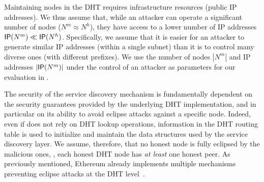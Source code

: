 Maintaining nodes in the DHT requires infrastructure resources (public IP addresses). We thus assume that, while an attacker can operate a significant number of nodes (\eg $N^m  \approx N^h$), they have access to a lower number of IP addresses $\mathsf{IP}(N^m)  \ll \mathsf{IP}(N^h)$.
Specifically, we assume that it is easier for an attacker to generate similar IP addresses (\ie within a single subnet) than it is to control many diverse ones (with different prefixes).
We use the number of nodes $|N^m|$ and IP addresses $|\mathsf{IP}(N^m)|$ under the control of an attacker as parameters for our evaluation in .


The security of the service discovery mechanism is fundamentally dependent on the security guarantees provided by the underlying DHT implementation, and in particular on its ability to avoid eclipse attacks against a specific node.
Indeed, even if \sysname does not rely on DHT lookup operations, information in the DHT routing table is used to initialize and maintain the data structures used by the service discovery layer.
We assume, therefore, that no honest node is fully eclipsed by the malicious ones, \ie, each honest DHT node has \emph{at least} one honest peer.
As previously mentioned, Ethereum already implements multiple mechanisms preventing eclipse attacks at the DHT level~\cite{marcus2018low, henningsen2019eclipsing}.  


